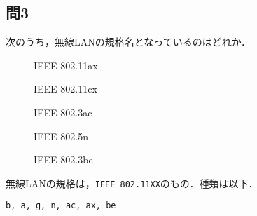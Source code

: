 \documentclass[paper=a4,10pt,twocolumn]{jlreq}
\begin{document}
\subsection*{問3}
次のうち，無線LANの規格名となっているのはどれか．
\begin{description}
    \item[\ci] IEEE 802.11ax
    \item[\bt] IEEE 802.11cx
    \item[\bt] IEEE 802.3ac
    \item[\bt] IEEE 802.5n
    \item[\bt] IEEE 802.3be
\end{description}
無線LANの規格は，\verb|IEEE 802.11XX|のもの．種類は以下．
\begin{center}
    \verb|b, a, g, n, ac, ax, be|
\end{center}
\end{document}
